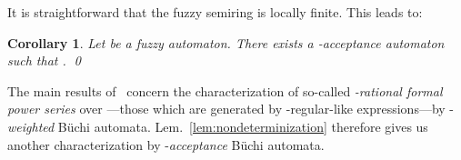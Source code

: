 \documentclass[a4paper,USenglish,numberwithinsect]{lipics}
\theoremstyle{definition}
\theoremstyle{remark}
\theoremstyle{plain}
\newtheorem{cor}[defi]{Corollary}
\begin{document}
It is straightforward that the fuzzy semiring  is locally
finite. This leads to:
\begin{cor}
  Let  be a fuzzy automaton. There exists a -acceptance 
  automaton  such that 
 .
\qed
\end{cor}

The main results of~\cite{Rahonis05,DrosteP07} concern the
characterization of so-called \emph{-rational formal power
series} over ---those which are generated by
-regular-like expressions---by -\emph{weighted} B\"uchi
automata. Lem.~\ref{lem:nondeterminization} therefore gives us another
characterization by -\emph{acceptance} B\"uchi automata.
\end{document}
